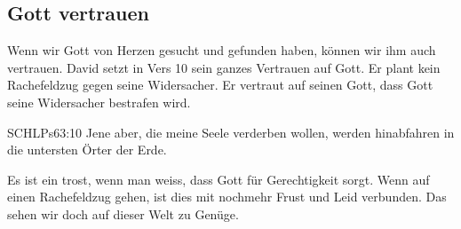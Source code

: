 \documentclass[14pt]{../../inc/mybib}
\begin{document}
    \subsection{Gott vertrauen}
    Wenn wir Gott von Herzen gesucht und gefunden haben, können wir ihm auch vertrauen. David setzt in Vers 10 sein ganzes Vertrauen auf Gott. Er plant kein Rachefeldzug gegen seine Widersacher. Er vertraut auf seinen Gott, dass Gott seine Widersacher bestrafen wird.
    \begin{bibelbox}{SCHL}{Ps}{63:10}
        Jene aber, die meine Seele verderben wollen, werden hinabfahren in die untersten Örter der Erde.
    \end{bibelbox}
    Es ist ein trost, wenn man weiss, dass Gott für Gerechtigkeit sorgt. Wenn auf einen Rachefeldzug gehen, ist dies mit nochmehr Frust und Leid verbunden. Das sehen wir doch auf dieser Welt zu Genüge.
\end{document}
